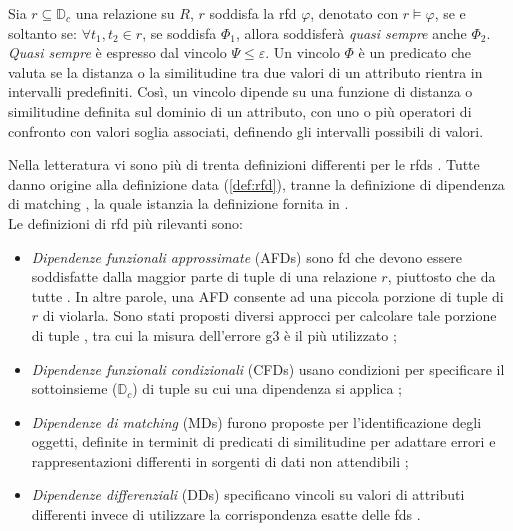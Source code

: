 Sia $r\subseteq\mathbb{D}_c$ una relazione su $R$, $r$ soddisfa la \acrshort{rfd} $\varphi$, denotato con $r\models\varphi$, se e soltanto se: $\forall t_1,t_2 \in r$, se soddisfa $\Phi_1$, allora soddisfer\`{a} \textit{quasi sempre} anche $\Phi_2$. \textit{Quasi sempre} \`{e} espresso dal vincolo $\Psi\leq\varepsilon$. Un vincolo $\Phi$ \`{e} un predicato che valuta se la distanza o la similitudine tra due valori di un attributo rientra in intervalli predefiniti. Cos\`{i}, un vincolo dipende su una funzione di distanza o similitudine definita sul dominio di un attributo, con uno o pi\`{u} operatori di confronto con valori soglia associati, definendo gli intervalli possibili di valori.\par
Nella letteratura vi sono pi\`{u} di trenta definizioni differenti per le \acrshort{rfds} \cite{rfdsurvey}. Tutte danno origine alla definizione data (\ref{def:rfd}), tranne la definizione di dipendenza di matching \cite{dynamicconstraints}, la quale istanzia la definizione fornita in \cite{rfdsurvey}.
\\Le definizioni di \acrshort{rfd} pi\`{u} rilevanti sono:
\begin{itemize}
    \item \textit{Dipendenze funzionali approssimate} (AFDs) sono \acrshort{fd} che devono essere soddisfatte dalla maggior parte di tuple di una relazione $r$, piuttosto che da tutte \cite{approximateinferencefd}. In altre parole, una AFD consente ad una piccola porzione di tuple di $r$ di violarla. Sono stati proposti diversi approcci per calcolare tale porzione di tuple \cite{approx4fd}, tra cui la misura dell'errore g3 \`{e} il pi\`{u} utilizzato \cite{approximateinferencefd};
    \item \textit{Dipendenze funzionali condizionali} (CFDs) usano condizioni per specificare il sottoinsieme ($\mathbb{D}_c$) di tuple su cui una dipendenza si applica \cite{conditionalfd4datacleaning};
    \item \textit{Dipendenze di matching} (MDs) furono proposte per l'identificazione degli oggetti, definite in terminit di predicati di similitudine per adattare errori e rappresentazioni differenti in sorgenti di dati non attendibili \cite{dynamicconstraints};
    \item \textit{Dipendenze differenziali} (DDs) specificano vincoli su valori di attributi differenti invece di utilizzare la corrispondenza esatte delle \acrshort{fds} \cite{differentialdependencies}.
\end{itemize}

